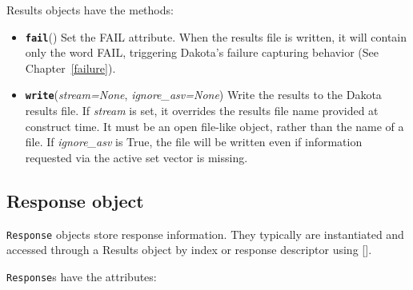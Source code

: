 Results objects have the methods:

\begin{itemize}
  \item{}
	  \label{index:dakota.interfacing.Results.fail}\textbf{\texttt{fail}}{()}{}
	  Set the FAIL attribute. When the results file is written, it will contain only the word FAIL, triggering Dakota's failure capturing behavior (See Chapter~\ref{failure}).

\item {}
	\label{index:dakota.interfacing.Results.write}\textbf{\texttt{write}}({\emph{stream=None}, \emph{ignore\_asv=None}}){}
Write the results to the Dakota results file. If \emph{stream} is set, it overrides the results file name provided at construct time. It must be an open file-like object, rather than the name of a file. If \emph{ignore\_asv} is True, the file will be written even if information requested via the active set vector is missing.

\end{itemize}

\subsection{Response object}

{\tt Response} objects store response information. They typically are instantiated and accessed through a Results object by index or response descriptor using {[}{]}.

{\tt Response}s have the attributes:

